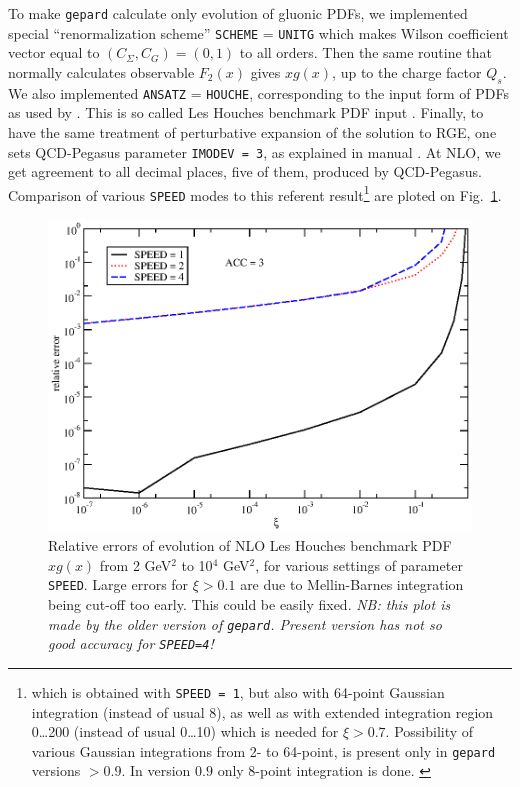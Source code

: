 \documentclass[12pt]{article}
\begin{document}
To make \texttt{gepard} calculate only evolution of gluonic PDFs, we implemented special ``renormalization
scheme'' \texttt{SCHEME} = \texttt{UNITG} which
makes Wilson coefficient vector equal to $(C_{\Sigma}, C_G) = (0, 1)$
to all orders. Then the same routine that normally calculates observable $F_2(x)$ gives $x g(x)$, up
to the charge factor $Q_s$. We also implemented \texttt{ANSATZ} = \texttt{HOUCHE}, corresponding to the
input form of PDFs as used by \cite{Vogt:2004ns}. This is so called Les Houches benchmark PDF
input \cite{Giele:2002hx}.  Finally, to have the same treatment of perturbative expansion of
the solution to RGE, one sets {\sc QCD-Pegasus} parameter \texttt{IMODEV = 3}, as explained in
manual \cite{Vogt:2004ns}. 
At NLO, we get agreement to all decimal places, five of them, produced by {\sc QCD-Pegasus}. 
Comparison of various \texttt{SPEED} modes to this referent result\footnote{which is obtained with
\texttt{SPEED = 1}, but also with 64-point Gaussian integration (instead of usual 8), as well
as with extended integration region 0\dots 200 (instead of usual 0\dots 10) which is needed 
for $\xi > 0.7$. Possibility of various Gaussian integrations from 2-  to 64-point, is present
only in \texttt{gepard} versions $> 0.9$. In version $0.9$ only 8-point integration is done.
\label{fn:acc}} are ploted on Fig.~\ref{fig:PDFevol}.

\begin{figure}
\begin{center}
\includegraphics[scale=0.8]{PDFevol}
\end{center}
\caption{Relative errors of evolution of NLO Les Houches benchmark PDF $x g(x)$
from 2 GeV$^2$ to 10$^4$ GeV$^2$, for various settings of parameter
\texttt{SPEED}. Large errors for $\xi > 0.1$ are due to Mellin-Barnes integration
being cut-off too early. This could be easily fixed. \emph{NB: this plot is made
by the older version of \texttt{gepard}. Present version has not so good
accuracy for \texttt{SPEED=4}!}}
\label{fig:PDFevol}
\end{figure}
\end{document}
